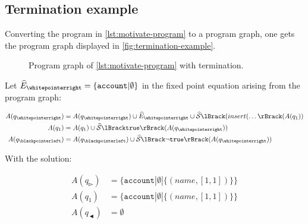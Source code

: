 \subsection{Termination example}

Converting the program in \autoref{lst:motivate-program} to a program graph, one gets the program graph displayed in \autoref{fig:termination-example}.

\begin{figure}
    \centering
    
    \caption{Program graph of \autoref{lst:motivate-program} with termination.}
    \label{fig:termination-example}
\end{figure}

Let $\ab{E}_\whitepointerright = \{ \texttt{account} | \emptyset \}$ in the fixed point equation arising from the program graph:

\begin{align}
    A(q_\whitepointerright) &= A(q_\whitepointerright) \cup \ab{E}_\whitepointerright \cup \abssem{(insert(\dots}(A(q_1)) \\
    A(q_1) &= A(q_1) \cup \abssem{\texttt{true}}(A(q_\whitepointerright)) \\
    A(q_\blackpointerleft) &= A(q_\blackpointerleft) \cup \abssem{\neg\texttt{true}}(A(q_\whitepointerright))
\end{align}

With the solution:

\begin{align}
    A(q_\whitepointerright) &= \{ \texttt{account} | \emptyset | \{(name, [1, 1])\}\} \\
    A(q_1) &= \{ \texttt{account} | \emptyset | \{(name, [1, 1])\}\} \\
    A(q_\blackpointerleft) &= \emptyset
\end{align}
